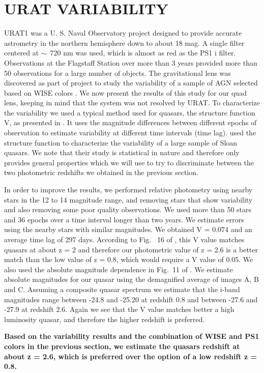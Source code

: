 \documentclass[manuscript]{aastex}
\begin{document}
{\bf
\section{URAT VARIABILITY}

URAT1 was a U. S. Naval Observatory project designed to provide accurate astrometry in the northern hemisphere down to about 18 mag. A single filter centered at $\sim$~720 nm was used, which is almost as red as the PS1 i filter. Observations at the Flagstaff Station over more than 3 years provided more than 50 observations for a large number of objects. The gravitational lens was discovered as part of project to study the variability of a sample of AGN selected based on WISE colors \citep{sec01}. We now present the results of this study for our quad lens, keeping in mind that the system was not resolved by URAT. To characterize the variability we used a typical method used for quasars, the structure function V, as presented in \citet{van04}. It uses the magnitude  differences between different epochs of observation to estimate variability at different time intervals (time lag). \citet{van04} used the structure function to characterize the variability of a large sample of Sloan quasars. We note that their study is statistical in nature and therefore only provides general properties which we will use to try to discriminate between the two photometric redshifts we obtained in the previous section.

In order to improve the results, we performed relative photometry using nearby stars in the 12 to 14 magnitude range, and removing stars that show variability and also removing some poor quality observations. We used more than 50 stars and 36 epochs over a time interval longer than two years. We estimate errors using the nearby stars with similar magnitudes. We obtained V = 0.074 and an average time lag of 297 days. According to Fig.~ 16 of \citet{van04}, this V value matches quasars at about z = 2 and therefore our photometric value of z = 2.6 is a better match than the low value of z = 0.8, which would require a V value of 0.05. We also used the absolute magnitude dependence in Fig.~11 of \citet{van04}. We estimate absolute magnitudes for our quasar using the demagnified average of images A, B and C. Assuming a composite quasar spectrum we estimate that the i-band magnitudes range between -24.8  and -25.20 at redshift 0.8 and between -27.6 and -27.9 at redshift 2.6. Again we see that the V value matches better a high luminosity quasar, and therefore the higher redshift is preferred.

{\bf Based on the variability results and the combination of WISE and PS1 colors in the previous section, we estimate the quasars redshift at about z = 2.6, which is preferred over the option of a low redshift z = 0.8.}
}
\end{document}
